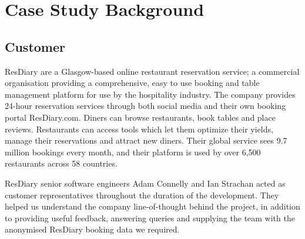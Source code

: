 \documentclass{l3proj}
\begin{document}
\newpage


\section{Case Study Background}
\label{sec:background}

\subsection{Customer}
\label{sec:customer}



ResDiary are a Glasgow-based online restaurant reservation service; a commercial organisation providing a comprehensive, easy to use booking and table management platform for use by the hospitality industry. The company provides 24-hour reservation services through both social media and their own booking portal ResDiary.com. Diners can browse restaurants, book tables and place reviews. Restaurants can access tools which let them optimize their yields, manage their reservations and attract new diners. Their global service sees 9.7 million bookings every month, and their platform is used by over 6,500 restaurants across 58 countries. 

ResDiary senior software engineers Adam Connelly and Ian Strachan acted as customer representatives throughout the duration of the development. They helped us understand the company line-of-thought behind the project, in addition to providing useful feedback, answering queries and supplying the team with the anonymised ResDiary booking data we required.
\end{document}
